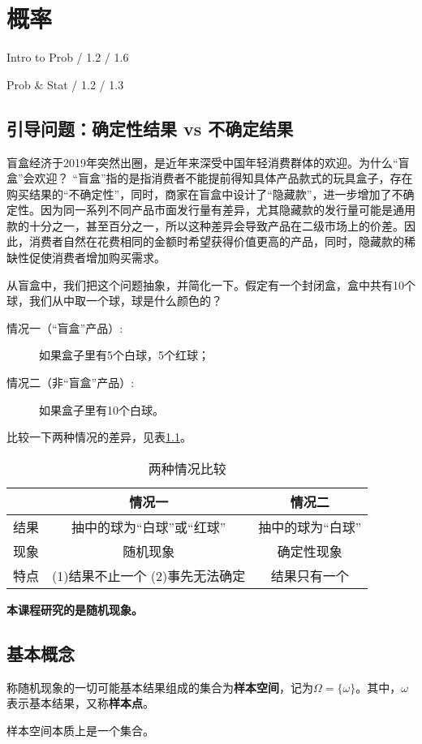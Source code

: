 \chapter{概率}
\begin{introduction}
  \item Intro to Prob / 1.2 / 1.6 
  \item Prob $\&$ Stat  / 1.2 / 1.3
\end{introduction}

\section{引导问题：确定性结果 vs 不确定结果}
\begin{instance}
    盲盒经济于2019年突然出圈，是近年来深受中国年轻消费群体的欢迎。为什么“盲盒”会欢迎？
“盲盒”指的是指消费者不能提前得知具体产品款式的玩具盒子，存在购买结果的“不确定性”，同时，商家在盲盒中设计了“隐藏款”，进一步增加了不确定性。因为同一系列不同产品市面发行量有差异，尤其隐藏款的发行量可能是通用款的十分之一，甚至百分之一，所以这种差异会导致产品在二级市场上的价差。因此，消费者自然在花费相同的金额时希望获得价值更高的产品，同时，隐藏款的稀缺性促使消费者增加购买需求。

从盲盒中，我们把这个问题抽象，并简化一下。假定有一个封闭盒，盒中共有10个球，我们从中取一个球，球是什么颜色的？
\begin{description}
\item[情况一（“盲盒”产品）:]如果盒子里有5个白球，5个红球；
\item[情况二（非“盲盒”产品）:]如果盒子里有10个白球。
\end{description}
比较一下两种情况的差异，见表\ref{tab:lect1_1}。
\begin{table}[htbp]
  \caption{两种情况比较\label{tab:lect1_1}}
  \centering
  \begin{tabular}{ccc}
  \hline
   & 情况一 & 情况二\\
  \hline
  结果& 抽中的球为“白球”或“红球” & 抽中的球为“白球” \\
  现象 & 随机现象 & 确定性现象\\
  特点 & (1)结果不止一个 (2)事先无法确定  & 结果只有一个\\
  \hline
  \end{tabular}
\end{table}
\end{instance}

\textbf{本课程研究的是随机现象。}

\section{基本概念}
\begin{definition}[样本空间与样本点] \label{def:sample space} 
称随机现象的一切可能基本结果组成的集合为{\bf 样本空间}，记为$\Omega = \{\omega\}$。其中，$\omega$表示基本结果，又称{\bf 样本点}。
\end{definition}
\begin{remark}
    样本空间本质上是一个集合。
\end{remark}


